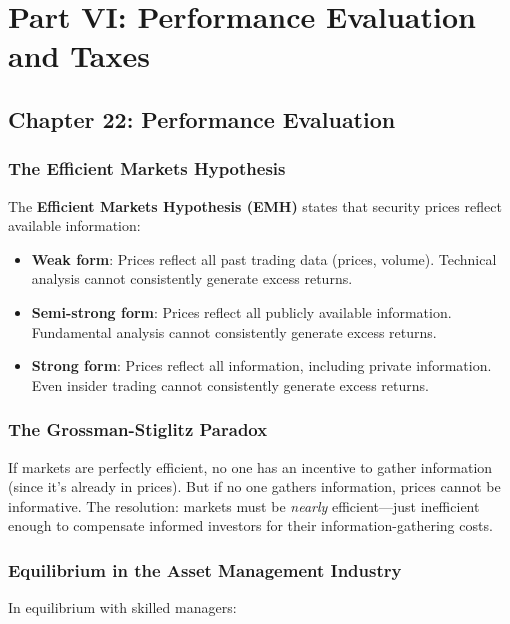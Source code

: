 \documentclass[11pt,letterpaper]{report}
\begin{document}
\part{Part VI: Performance Evaluation and Taxes}



\chapter{Chapter 22: Performance Evaluation}


\section{The Efficient Markets Hypothesis}


The \textbf{Efficient Markets Hypothesis (EMH)} states that security prices reflect available information:

\begin{itemize}
  \item \textbf{Weak form}: Prices reflect all past trading data (prices, volume).  Technical analysis cannot consistently generate excess returns.
  \item \textbf{Semi-strong form}: Prices reflect all publicly available information.  Fundamental analysis cannot consistently generate excess returns.
  \item \textbf{Strong form}: Prices reflect all information, including private information.  Even insider trading cannot consistently generate excess returns.
\end{itemize}

\section{The Grossman-Stiglitz Paradox}


If markets are perfectly efficient, no one has an incentive to gather information (since it's already in prices).  But if no one gathers information, prices cannot be informative.  The resolution: markets must be \textit{nearly} efficient---just inefficient enough to compensate informed investors for their information-gathering costs.

\section{Equilibrium in the Asset Management Industry}


In equilibrium with skilled managers:
\end{document}
